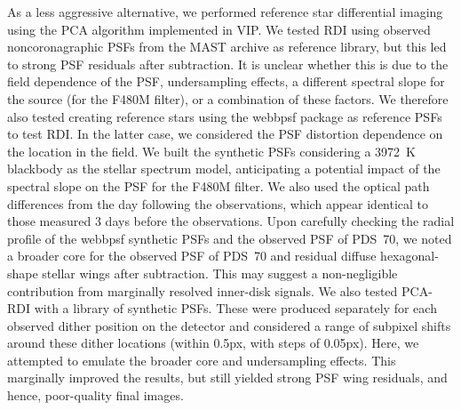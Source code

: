 \documentclass[longauth]{aa}
\begin{document}
\begin{appendix}
As a less aggressive alternative, we performed reference star differential imaging \citep[RDI; e.g.,][]{Mawet2012} using %
the PCA algorithm implemented in VIP. 
We tested RDI using observed noncoronagraphic PSFs from the MAST archive as reference library, but this led to strong PSF residuals after subtraction.
It is unclear whether this is due to the field dependence of the PSF, undersampling effects, a different spectral slope for the source (for the F480M filter), or a combination of these factors.  
We therefore also tested creating reference stars using the {\sc webbpsf} package \citep[v1.1.1;][]{Perrin2014} as reference PSFs to test RDI. In the latter case, we considered the PSF distortion dependence on the location in the field. We built the synthetic PSFs considering a 3972~K blackbody \citep{Muller2018} as the stellar spectrum model, anticipating a potential impact of the spectral slope on the PSF for the F480M filter. We also used the optical path differences from the day following the observations, which appear identical to those measured 3 days before the observations. 
Upon carefully checking the radial profile of the {\sc webbpsf} synthetic PSFs and the observed PSF of PDS~70, we noted a broader core for the observed PSF of PDS~70 and residual diffuse hexagonal-shape stellar wings after subtraction. This may suggest a non-negligible contribution from marginally resolved inner-disk signals. We also tested PCA-RDI with a library of synthetic PSFs. These were produced separately for each observed dither position on the detector and considered a range of subpixel shifts around these dither locations (within 0.5px, with steps of 0.05px). Here, we attempted to emulate the broader core and undersampling effects. %
This marginally improved the results, but still yielded strong PSF wing residuals, and hence, poor-quality final images. 


\end{appendix}
\end{document}
